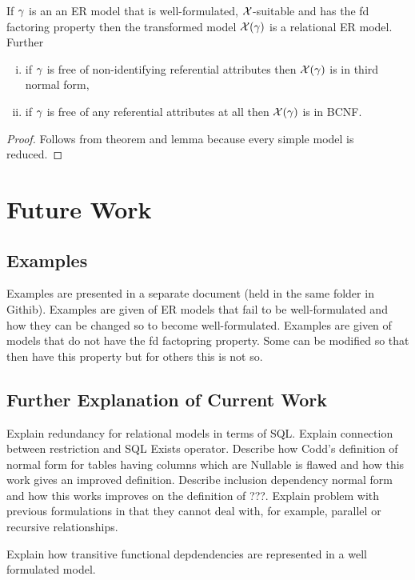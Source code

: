 \begin{theorem}
If  $\gamma$ is an an ER model that is well-formulated,  $\mathcal{X}$-suitable and has the fd factoring property
then the transformed model $\mathcal{X}(\gamma)$ is a  relational ER model. Further
\begin{enumerate}[(i)]
\item  if $\gamma$ is free of non-identifying referential attributes then  $\mathcal{X}(\gamma)$ is in third normal form, 
\item 
if $\gamma$ is free of any referential attributes at all then  $\mathcal{X}(\gamma)$ is in BCNF.
\end{enumerate}
\end{theorem}
\begin{proof}
Follows from theorem  and lemma  because every simple model is reduced.
\end{proof}

\section{Future Work}

\subsection{Examples}
Examples are presented in a separate document (held in the same folder in Githib). Examples are given of ER models that fail to be well-formulated and how they can be changed so to become well-formulated.  Examples are given of models that do not have the fd factopring property. Some can be modified 
so that then have this property but for others this is not so. 
\subsection{Further Explanation of Current Work}
Explain redundancy for relational models in terms of SQL. 
Explain connection between restriction and SQL Exists operator.
Describe how Codd's definition of normal form for tables having columns which are Nullable is flawed and how this work gives an improved definition. 
Describe inclusion dependency normal form and how this works improves on the definition of ???. Explain problem with previous formulations
in that they cannot deal with, for example, parallel or recursive relationships. 

Explain how transitive functional depdendencies are represented in a well formulated model. 

